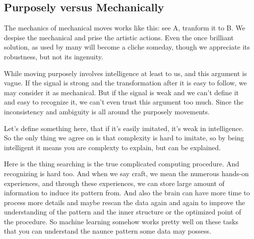 \subsection{Purposely versus Mechanically}

The mechanics of mechanical moves works like this: see A, tranform it to B. We despise the mechanical and prise the artistic actions. Even the once brilliant solution, as used by many will become a cliche someday, though we appreciate its robustness, but not its ingenuity.

While moving purposely involves intelligence at least to us, and this argument is vague. If the signal is strong and the transformation after it is easy to follow, we may consider it as mechanical. But if the signal is weak and we can't define it and easy to recognize it, we can't even trust this argument too much. Since the inconsistency and ambiguity is all around the purposely movements.

Let's define something here, that if it's easily imitated, it's weak in intelligence. So the only thing we agree on is that complexity is hard to imitate, so by being intelligent it means you are complexty to explain, but can be explained.

Here is the thing searching is the true complicated computing procedure. And recognizing is hard too. And when we say craft, we mean the numerous hands-on experiences, and through these experiences, we can store large amount of information to induce its pattern from. And also the brain can have more time to process more details and maybe rescan the data again and again to improve the understanding of the pattern and the inner structure or the optimized point of the procedure. So machine learning somehow works pretty well on these tasks that you can understand the naunce pattern some data may possess.
